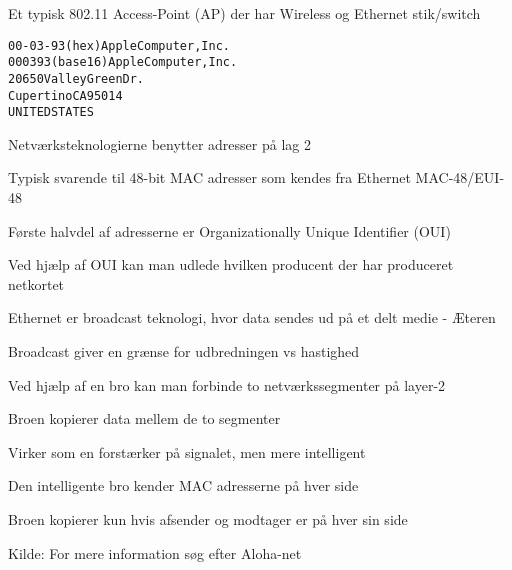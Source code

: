 \documentclass[Screen16to9,17pt]{foils}
\begin{document}
\begin{list1}
\item Et typisk 802.11 Access-Point (AP) der har Wireless og Ethernet stik/switch
\end{list1}


\begin{alltt}
00-03-93   (hex)        Apple Computer, Inc.
000393     (base 16)    Apple Computer, Inc.
                        20650 Valley Green Dr.
                        Cupertino CA 95014
                        UNITED STATES
\end{alltt}
\begin{list1}
\item Netværksteknologierne benytter adresser på lag 2
\item Typisk svarende til 48-bit MAC adresser som kendes fra Ethernet MAC-48/EUI-48
\item Første halvdel af adresserne er Organizationally Unique Identifier (OUI)
\item Ved hjælp af OUI kan man udlede hvilken producent der har produceret netkortet
\item {}
\end{list1}




\begin{list1}
\item Ethernet er broadcast teknologi, hvor data sendes ud på et delt medie - Æteren
\item Broadcast giver en grænse for udbredningen vs hastighed
\item Ved hjælp af en bro kan man forbinde to netværkssegmenter på layer-2
\item Broen kopierer data mellem de to segmenter
\item Virker som en forstærker på signalet, men mere intelligent
\item Den intelligente bro kender MAC adresserne på hver side
\item Broen kopierer kun hvis afsender og modtager er på hver sin side
\end{list1}

Kilde: For mere information søg efter Aloha-net\\ 

\end{document}
